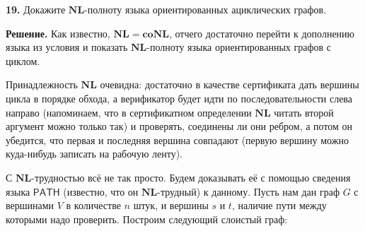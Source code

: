 \textbf{19.} Докажите $\mathbf{NL}$-полноту языка ориентированных ациклических графов.

\textbf{Решение.} Как известно, $\mathbf{NL}=\mathbf{coNL}$, отчего достаточно перейти к дополнению языка из условия и показать $\mathbf{NL}$-полноту языка ориентированных графов с циклом.

Принадлежность $\mathbf{NL}$ очевидна: достаточно в качестве сертификата дать вершины цикла в порядке обхода, а верификатор будет идти по последовательности слева направо (напоминаем, что в сертификатном определении $\mathbf{NL}$ читать второй аргумент можно только так) и проверять, соединены ли они ребром, а потом он убедится, что первая и последняя вершина совпадают (первую вершину можно куда-нибудь записать на рабочую ленту).

С $\mathbf{NL}$-трудностью всё не так просто. Будем доказывать её с помощью сведения языка $\mathsf{PATH}$ (известно, что он $\mathbf{NL}$-трудный) к данному. Пусть нам дан граф $G$ с вершинами $V$ в количестве $n$ штук, и вершины $s$ и $t$, наличие пути между которыми надо проверить. Построим следующий слоистый граф:
